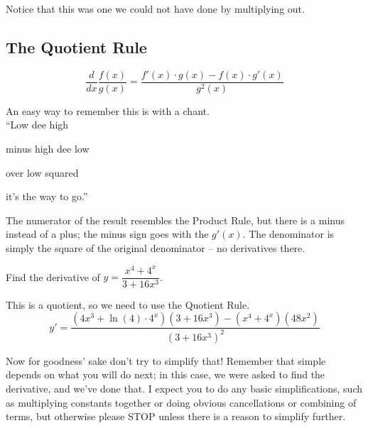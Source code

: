 Notice that this was one we could not have done by multiplying out.


\subsection{The Quotient Rule}
\begin{theorem}
$$\dfrac{d}{dx}\dfrac{f(x)}{g(x)} = \dfrac{f'(x)\cdot g(x)-f(x)\cdot g'(x)}{g^2(x)}$$
\end{theorem}
An easy way to remember this is with a chant.\\

``Low dee high

minus high dee low

over low squared

it's the way to go.''

The numerator of the result resembles the Product Rule, but there is a minus instead of a plus; the minus sign goes with the $g'(x)$. The denominator is simply the square of the original denominator -- no derivatives there.

\begin{example}
Find the derivative of $ y=\dfrac{x^4+4^x}{3+16x^3} $.

\begin{solution} This is a quotient, so we need to use the Quotient Rule.
$$y'=\dfrac{\left(4x^3+\ln(4)\cdot 4^x \right)\left(3+16x^3 \right)-\left(x^4+4^x \right)\left(48x^2 \right)}{\left(3+16x^3 \right)^2}$$
\end{solution}\end{example}

Now for goodness' sake don't try to simplify that! Remember that simple depends on what you will do next; in this case, we were asked to find the derivative, and we've done that. I expect you to do any basic simplifications, such as multiplying constants together or doing obvious cancellations or combining of terms, but otherwise please STOP unless there is a reason to simplify further.

